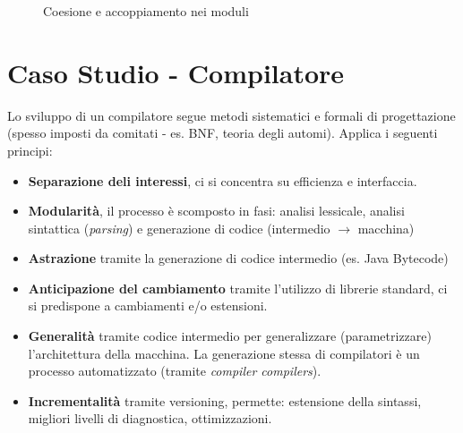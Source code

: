 \begin{figure}[h!]
  \centering
  \hfill
  \caption{Coesione e accoppiamento nei moduli}
\end{figure}

\section{Caso Studio - Compilatore}

Lo sviluppo di un compilatore segue metodi sistematici e formali di progettazione (spesso imposti da comitati - es. BNF, teoria degli automi). Applica i seguenti principi:
\begin{itemize}
    \item \textbf{Separazione deli interessi}, ci si concentra su efficienza e interfaccia.
    \item \textbf{Modularità}, il processo è scomposto in fasi: analisi lessicale, analisi sintattica (\textit{parsing}) e generazione di codice (intermedio $\rightarrow$ macchina)
    \item \textbf{Astrazione} tramite la generazione di codice intermedio (es. Java Bytecode)
    \item \textbf{Anticipazione del cambiamento} tramite l'utilizzo di librerie standard, ci si predispone a cambiamenti e/o estensioni.
    \item \textbf{Generalità} tramite codice intermedio per generalizzare (parametrizzare) l'architettura della macchina. La generazione stessa di compilatori è un processo automatizzato (tramite \textit{compiler compilers}).
    \item \textbf{Incrementalità} tramite versioning, permette: estensione della sintassi, migliori livelli di diagnostica, ottimizzazioni.
\end{itemize}

